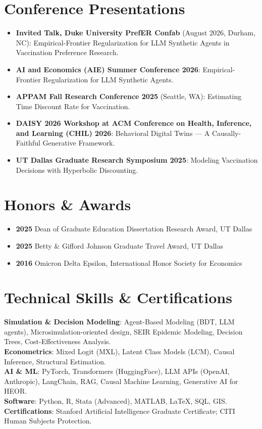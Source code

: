 \documentclass[11pt, letterpaper]{article}
\begin{document}
\section*{Conference Presentations}
\begin{itemize}[noitemsep, topsep=0pt]
    \item \textbf{Invited Talk, Duke University PrefER Confab} (August 2026, Durham, NC): Empirical-Frontier Regularization for LLM Synthetic Agents in Vaccination Preference Research.
    \item \textbf{AI and Economics (AIE) Summer Conference 2026}: Empirical-Frontier Regularization for LLM Synthetic Agents.
    \item \textbf{APPAM Fall Research Conference 2025} (Seattle, WA): Estimating Time Discount Rate for Vaccination.
    \item \textbf{DAISY 2026 Workshop at ACM Conference on Health, Inference, and Learning (CHIL) 2026}: Behavioral Digital Twins --- A Causally-Faithful Generative Framework.
    \item \textbf{UT Dallas Graduate Research Symposium 2025}: Modeling Vaccination Decisions with Hyperbolic Discounting.
\end{itemize}

\section*{Honors \& Awards}
\begin{itemize}[noitemsep, topsep=0pt]
    \item \textbf{2025} Dean of Graduate Education Dissertation Research Award, UT Dallas
    \item \textbf{2025} Betty \& Gifford Johnson Graduate Travel Award, UT Dallas
    \item \textbf{2016} Omicron Delta Epsilon, International Honor Society for Economics
\end{itemize}

\section*{Technical Skills \& Certifications}
\textbf{Simulation \& Decision Modeling}: Agent-Based Modeling (BDT, LLM agents), Microsimulation-oriented design, SEIR Epidemic Modeling, Decision Trees, Cost-Effectiveness Analysis. \\
\textbf{Econometrics}: Mixed Logit (MXL), Latent Class Models (LCM), Causal Inference, Structural Estimation. \\
\textbf{AI \& ML}: PyTorch, Transformers (HuggingFace), LLM APIs (OpenAI, Anthropic), LangChain, RAG, Causal Machine Learning, Generative AI for HEOR. \\
\textbf{Software}: Python, R, Stata (Advanced), MATLAB, LaTeX, SQL, GIS. \\
\textbf{Certifications}: Stanford Artificial Intelligence Graduate Certificate; CITI Human Subjects Protection.
\end{document}
